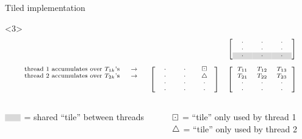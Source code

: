 \documentclass[12pt,aspectratio=1610]{beamer}
\begin{document}
\begin{frame}{Tiled implementation}
\begin{onlyenv}
\begin{onlyenv}<3>
\[
\scriptsize
\begin{array}{ccc}
&& \left[\begin{array}{ccc}
\ \ \cdot \ \ & \ \ \cdot \ \  & \ \ \cdot \ \ \\
\ \ \cdot \ \ & \ \ \cdot \ \  & \ \ \cdot \ \ \\
\ \ \cl{\cdot} \ \ & \ \ \cl{\cdot} \ \  & \ \ \cl{\cdot} \ \ \\
\end{array}\right]\\
\\
\begin{array}{r}
\text{thread 1 accumulates over $T_{1k}$'s} \ \ \ \ \rw\\
\text{thread 2 accumulates over $T_{2k}$'s} \ \ \ \ \rw\\
\\
\\
\end{array}
& \left[\begin{array}{ccc}
\ \ \cdot \ \ & \ \ \cdot \ \ & \bd \\
\ \ \cdot \ \ & \ \ \cdot \ \ & \uptri \\
\ \ \cdot \ \ & \ \ \cdot \ \  & \ \ \cdot \ \ \\
\ \ \cdot \ \ & \ \ \cdot \ \  & \ \ \cdot \ \ \\
\end{array}\right]
& \left[\begin{array}{ccc}
T_{11} & T_{12} & T_{13} \\
T_{21} & T_{22} & T_{23} \\
\ \ \cdot \ \ & \ \ \cdot \ \  & \ \ \cdot \ \ \\
\ \ \cdot \ \ & \ \ \cdot \ \  & \ \ \cdot \ \ \\
\end{array}\right]
\end{array}
\]
\end{onlyenv}

\vspace{0.3cm}

\begin{columns}
\begin{column}{0.5\textwidth}
\footnotesize
$\scriptsize\begin{array}{c}\cl{\ \ \ }\end{array}$ = shared ``tile'' between threads
\end{column}
\begin{column}{0.5\textwidth}
\footnotesize
$\boxdot$ = ``tile'' only used by thread 1\\
$\bigtriangleup$ = ``tile'' only used by thread 2
\end{column}
\end{columns}
\end{onlyenv}


\end{frame}
\end{document}
